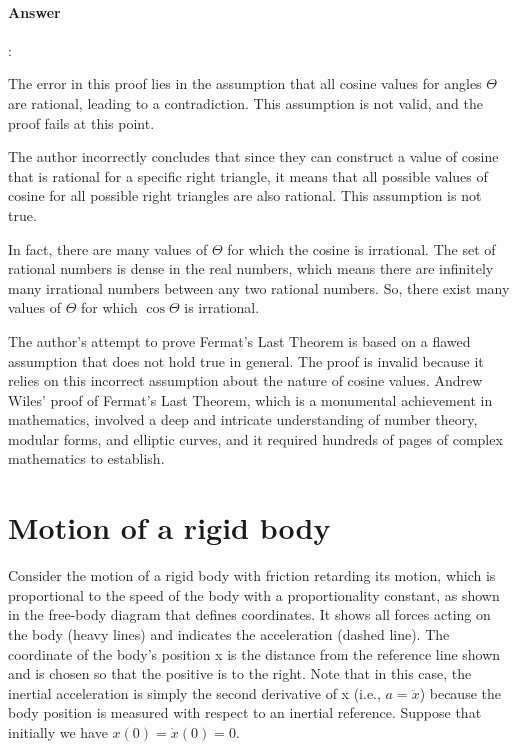 \documentclass{article}
\begin{document}
\paragraph{Answer}:

The error in this proof lies in the assumption that all cosine values for angles $\Theta$ are rational, leading to a contradiction. This assumption is not valid, and the proof fails at this point. 

The author incorrectly concludes that since they can construct a value of cosine that is rational for a specific right triangle, it means that all possible values of cosine for all possible right triangles are also rational. This assumption is not true.

In fact, there are many values of $\Theta$ for which the cosine is irrational. The set of rational numbers is dense in the real numbers, which means there are infinitely many irrational numbers between any two rational numbers. So, there exist many values of $\Theta$ for which $\cos \Theta$ is irrational.

The author's attempt to prove Fermat's Last Theorem is based on a flawed assumption that does not hold true in general. The proof is invalid because it relies on this incorrect assumption about the nature of cosine values. Andrew Wiles' proof of Fermat's Last Theorem, which is a monumental achievement in mathematics, involved a deep and intricate understanding of number theory, modular forms, and elliptic curves, and it required hundreds of pages of complex mathematics to establish.

\section{Motion of a rigid body}

Consider the motion of a rigid body with friction retarding its motion, which is proportional to the speed of the body with a proportionality constant, as shown in the free-body diagram that defines coordinates. It shows all forces acting on the body (heavy lines) and indicates the acceleration (dashed line). The coordinate of the body's position x is the distance from the reference line shown and is chosen so that the positive is to the right. Note that in this case, the inertial acceleration is simply the second derivative of x (i.e., $a = \ddot{x}$) because the body position is measured with respect to an inertial reference. Suppose that initially we have $x(0) = \dot{x}(0) = 0$.
\end{document}
